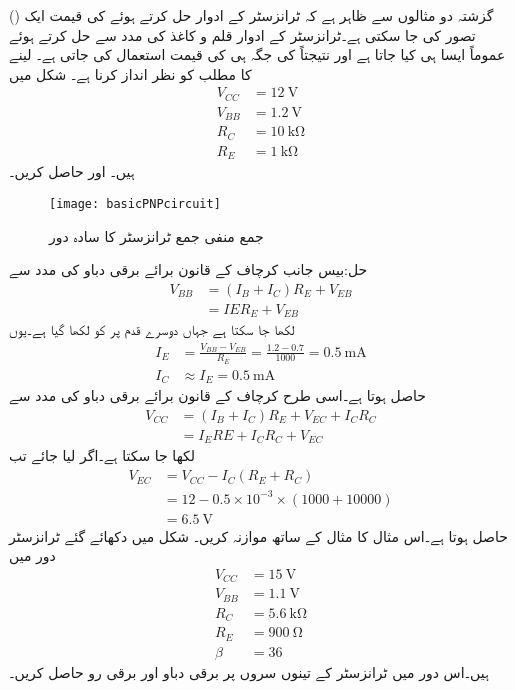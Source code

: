 گزشتہ دو مثالوں سے ظاہر ہے کہ ٹرانزسٹر کے ادوار حل کرتے ہوئے  کی قیمت ایک () تصور کی جا سکتی ہے۔ٹرانزسٹر کے ادوار قلم و کاغذ کی مدد سے حل کرتے ہوئے عموماً ایسا ہی کیا جاتا ہے اور نتیجتاً  کی جگہ  ہی کی قیمت استعمال کی جاتی ہے۔ لینے کا مطلب  کو نظر انداز کرنا ہے۔
شکل  میں
\begin{align*}
V_{CC}&=\SI{12}{\volt} \\
V_{BB}&=\SI{1.2}{\volt} \\
R_C& = \SI{10}{\kilo \ohm}\\
R_E&=\SI{1}{\kilo \ohm}
\end{align*}
ہیں۔ اور  حاصل کریں۔
\begin{figure}
\centering
\texttt{[image: basicPNPcircuit]}
\caption{جمع منفی جمع ٹرانزسٹر کا سادہ دور}
\label{شکل_ٹرانزسٹر__جمع_منفی_جمع_سادہ_دور}
\end{figure}

حل:بیس جانب کرچاف کے قانون برائے برقی دباو کی مدد سے 
\begin{align*}
V_{BB}&=\left(I_B+I_C \right) R_E+V_{EB}\\
&=IE R_E +V_{EB}
\end{align*}
لکھا جا سکتا ہے جہاں دوسرے قدم پر  کو  لکھا گیا ہے۔یوں
\begin{align*}
I_E&=\frac{V_{BB}-V_{EB}}{R_E}=\frac{1.2-0.7}{1000}=\SI{0.5}{\milli \ampere}\\
I_C &\approx I_E =\SI{0.5}{\milli \ampere} 
\end{align*}
حاصل ہوتا ہے۔اسی طرح کرچاف کے قانون برائے برقی دباو کی مدد سے
\begin{align*}
V_{CC}&=\left(I_B+I_C \right)R_E+V_{EC}+I_C R_C\\
&=I_E  RE + I_C R_C +V_{EC}
\end{align*}
لکھا جا سکتا ہے۔اگر  لیا جائے تب
\begin{align*}
V_{EC}&=V_{CC}-I_C \left(R_E+R_C \right)\\
&=12-0.5 \times 10^{-3} \times \left (1000+10000 \right)\\
&=\SI{6.5}{\volt}
\end{align*}
حاصل ہوتا ہے۔اس مثال کا مثال  کے ساتھ موازنہ کریں۔ 
شکل    میں دکھائے گئے ٹرانزسٹر دور میں
\begin{align*}
V_{CC} &=\SI{15}{\volt}\\
V_{BB} &=\SI{1.1}{\volt}\\
R_C&=\SI{5.6}{\kilo \ohm} \\
R_E &=\SI{900}{\ohm} \\
\beta &=36
\end{align*}
 ہیں۔اس دور میں ٹرانزسٹر کے تینوں سروں پر برقی دباو اور برقی رو حاصل کریں۔

